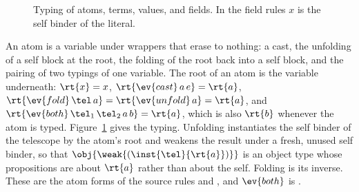 \begin{figure}
\small
{}
\caption{Typing of atoms, terms, values, and fields. In the field rules $x$ is the self binder of the literal.}
\label{fig:terms}
\end{figure}

An atom is a variable under wrappers that erase to nothing: a cast, the unfolding of a self block at the root, the folding of the root back into a self block, and the pairing of two typings of one variable. The root of an atom is the variable underneath: $\rt{x} = x$, $\rt{\ev{cast}\,a\,e} = \rt{a}$, $\rt{\ev{fold}\,\tel\,a} = \rt{\ev{unfold}\,a} = \rt{a}$, and $\rt{\ev{both}\,\tel_1\,\tel_2\,a\,b} = \rt{a}$, which is also $\rt{b}$ whenever the atom is typed. Figure~\ref{fig:terms} gives the typing. Unfolding instantiates the self binder of the telescope by the atom's root and weakens the result under a fresh, unused self binder, so that $\obj{\weak{(\inst{\tel}{\rt{a}})}}$ is an object type whose propositions are about $\rt{a}$ rather than about the self. Folding is its inverse. These are the atom forms of the source rules  and , and $\ev{both}$ is .

